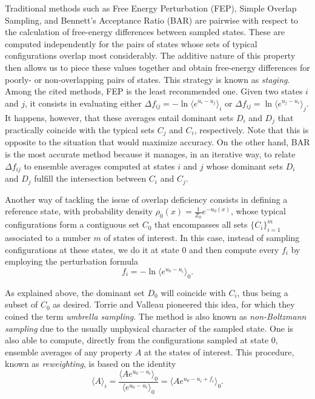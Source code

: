 \documentclass[aip,jcp,preprint,amsmath,amssymb]{revtex4-1}
\begin{document}
Traditional methods such as Free Energy Perturbation (FEP),\cite{Zwanzig_1954} Simple Overlap Sampling,\cite{Lee_1980, Lu_2003} and Bennett's Acceptance Ratio (BAR)\cite{Bennett_1976} are pairwise with respect to the calculation of free-energy differences between sampled states. These are computed independently for the pairs of states whose sets of typical configurations overlap most considerably. The additive nature of this property then allows us to piece these values together and obtain free-energy differences for poorly- or non-overlapping pairs of states. This strategy is known as \textit{staging}.\cite{Kofke_1998} Among the cited methods, FEP is the least recommended one. Given two states $i$ and $j$, it consists in evaluating either $\Delta f_{ij} = -\ln \langle e^{u_i - u_j} \rangle_i$ or $\Delta f_{ij} = \ln \langle e^{u_j - u_i} \rangle_j$.\cite{Zwanzig_1954} It happens, however, that these averages entail dominant sets $D_i$ and $D_j$ that practically coincide with the typical sets $C_j$ and $C_i$, respectively.\cite{Jarzynski_2006} Note that this is opposite to the situation that would maximize accuracy. On the other hand, BAR is the most accurate method because it manages, in an iterative way, to relate $\Delta f_{ij}$ to ensemble averages computed at states $i$ and $j$ whose dominant sets $D_i$ and $D_j$ fulfill the intersection between $C_i$ and $C_j$.

Another way of tackling the issue of overlap deficiency consists in defining a reference state, with probability density $\rho_0(x) = \frac{1}{Z_0}e^{-u_0(x)}$, whose typical configurations form a contiguous set $C_0$ that encompasses all sets $\{C_i\}_{i=1}^m$ associated to a number $m$ of states of interest. In this case, instead of sampling configurations at these states, we do it at state $0$ and then compute every $f_i$ by employing the perturbation formula
\begin{equation}
\label{eq:umbrella sampling free energy}
f_i = -\ln \langle e^{u_0-u_i} \rangle_0.
\end{equation}

As explained above, the dominant set $D_0$ will coincide with $C_i$, thus being a subset of $C_0$ as desired. Torrie and Valleau\cite{Torrie_1977} pioneered this idea, for which they coined the term \textit{umbrella sampling}. The method is also known as \textit{non-Boltzmann sampling} due to the usually unphysical character of the sampled state. One is also able to compute, directly from the configurations sampled at state $0$, ensemble averages of any property $A$ at the states of interest. This procedure, known as \textit{reweighting}, is based on the identity\cite{Torrie_1977}
\begin{equation}
\label{eq:umbrella sampling reweighting}
\langle A \rangle_i = \frac{\langle A e^{u_0 - u_i} \rangle_0}{\langle e^{u_0 - u_i} \rangle_0} = \langle A e^{u_0 - u_i + f_i} \rangle_0.
\end{equation}
\end{document}

